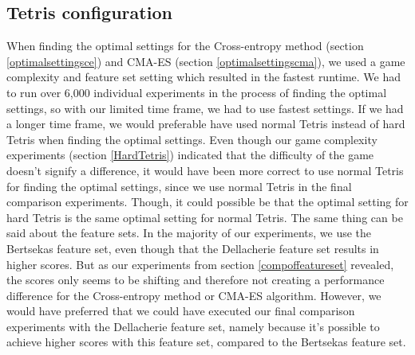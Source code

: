 \subsection{Tetris configuration}

When finding the optimal settings for the Cross-entropy method (section \ref{optimalsettingsce})
and CMA-ES (section \ref{optimalsettingscma}), we used a game complexity and feature set 
setting which resulted in the fastest runtime. We had to run over 6,000 individual experiments
in the process of finding the optimal settings, so with our limited time frame, we had
to use fastest settings.
If we had a longer time frame, we would preferable have used normal Tetris instead
of hard Tetris when finding the optimal settings. Even though our game complexity experiments
(section \ref{HardTetris}) indicated that the difficulty of the game doesn't signify a difference, it would have been more correct to use normal Tetris for finding the optimal settings, since
we use normal Tetris in the final comparison experiments. Though, it could possible be that the
optimal setting for hard Tetris is the same optimal setting for normal Tetris.
The same thing can be said about the feature sets. In the majority of our experiments, we
use the Bertsekas feature set, even though that the Dellacherie feature set results in
higher scores. But as our experiments from section \ref{compoffeatureset} revealed, the
scores only seems to be shifting and therefore not creating a performance difference for
the Cross-entropy method or CMA-ES algorithm. However, we would have preferred that we could have
executed our final comparison experiments with the Dellacherie feature set, namely because
it's possible to achieve higher scores with this feature set, compared to the Bertsekas feature
set.

